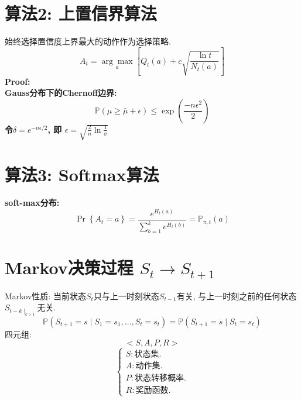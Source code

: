         \section{算法2: 上置信界算法}
            始终选择置信度上界最大的动作作为选择策略.
            $$A_{t} = \underset{a}{\arg\max}\left[Q_{t}(a)+c \sqrt{\frac{\ln t}{N_{t}(a)}}\right]$$
            \bf{Proof}:\\
                Gauss分布下的Chernoff边界:
                    $$\mathbb{P}(\mu \geq \bar{\mu}+\epsilon) \leq \exp \left(\frac{-n \epsilon^{2}}{2}\right)$$
                令$\delta = e^{-n \epsilon / 2}$, 即 $\epsilon = \sqrt{\frac{2}{n} \ln \frac{1}{\sigma}}$
                
        \section{算法3: Softmax算法}
            \bf{soft-max分布}:
                $$\operatorname{Pr}\left\{A_{t}=a\right\} = \frac{e^{H_{t}(a)}}{\sum_{b=1}^{k} e^{H_{t}(b)}} = \mathbb{P}_{\pi,t}(a)$$
    
    \section{Markov决策过程 $S_t \to S_{t+1}$}
        Markov性质: 当前状态$S_t$只与上一时刻状态$S_{t-1}$有关, 与上一时刻之前的任何状态$S_{t-k \mid_{k > 1}}$无关.
            $$\mathbb{P}\left(S_{t+1}=s \mid S_{1}=s_{1}, \ldots, S_{t}=s_{t}\right)=\mathbb{P}\left(S_{t+1}=s \mid S_{t}=s_{t}\right)$$
        四元组:
            $$<S, A, P, R>$$
            \begin{displaymath} \left\{ \begin{array}{l}
                S: \text{状态集.}\\
                A: \text{动作集.}\\
                P: \text{状态转移概率.}\\
                R: \text{奖励函数}.
            \end{array} \right. \end{displaymath}
            
